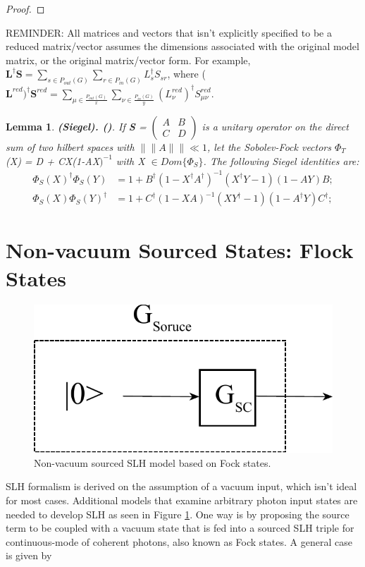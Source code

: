 \documentclass[a4paper]{article}
\newtheorem{lemma}{Lemma}[section]
\theoremstyle{definition}
\begin{document}
\begin{enumerate}[label=(\roman*)]
\begin{proof}
\end{proof}
REMINDER: All matrices and vectors that isn't explicitly specified to be a reduced matrix/vector assumes the dimensions associated with the original model matrix, or the original matrix/vector form. For example, $\textbf{L}^\dagger \textbf{S} = 
 \sum_{s \in P_{out}(G)}\sum_{r \in P_{in}(G)} L_s^\dagger S_{sr}$, where  
($\textbf{L}^{red})^\dagger \textbf{S}^{red} =  \sum_{\mu \in 
\frac{P_{out}(G)}{x}} \sum_{\nu \in 
\frac{P_{in}(G)}{y}} (L_{\nu}^{red})^\dagger S^{red}_{\mu \nu}$. 
\begin{lemma}
\textbf{(Siegel). (\citealp{Gough_2008})}. If \textbf{S} = $\begin{pmatrix}
A & B \\
C & D
\end{pmatrix}$ is a unitary operator on the direct sum of two hilbert spaces with $\|\|A\|\| \ll 1$, let the Sobolev-Fock vectors $\Phi_T$(X) = D + CX(1-AX$)^{-1}$ with X $\in Dom\{\Phi_S\}$. The following Siegel identities are:
\begin{align}
    \Phi_S(X)^\dagger \Phi_S(Y) & = 1 + B^\dagger(1-X^\dagger A^\dagger)^{-1}(X^\dagger Y -1)(1-AY)B; \nonumber \\
    \Phi_S (X) \Phi_S(Y)^\dagger & = 1 + C^\dagger (1-X A)^{-1}(XY^\dagger -1)(1-A^\dagger Y)C^\dagger; \nonumber 
\end{align}
\end{lemma}


\end{enumerate}



\section{ Non-vacuum Sourced States: Flock States}

\begin{figure}[H]
\centering
\includegraphics[width = 7.5 cm]{Soruce_term.pdf}
\caption{Non-vacuum sourced SLH model based on Fock states.
}
\label{fig:soruced_term}
\end{figure}  
SLH formalism is derived on the assumption of a vacuum input, which isn't ideal for most cases. Additional models that examine arbitrary photon input states are needed to develop SLH as seen in Figure \ref{fig:soruced_term}. One way is by proposing the source term to be coupled with a vacuum state that is fed into a sourced SLH triple for continuous-mode of coherent photons, also known as Fock states. A general case is given by  
\end{document}
